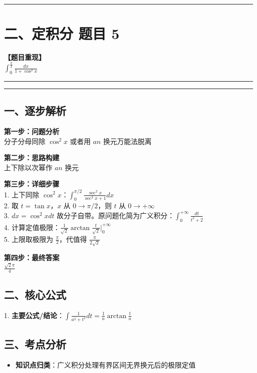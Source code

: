 ﻿\documentclass[12pt, a4paper]{ctexart}
\newcommand{\TopSeparator}{
    \par\noindent\rule{\textwidth}{1.5pt}\vspace{0.5em}
}
\newcommand{\AnalysisSeparator}{
    \par\noindent\rule{\textwidth}{0.5pt}\vspace{0.2em}\hrule\vspace{0.5em}
}
\newenvironment{RedAnalysis}{
    \par
    \color{red} 
}{
    \par
    \color{black} 
}
\begin{document}
\vspace{2em}

\TopSeparator
\section*{二、定积分 题目 5}

\textbf{【题目重现】} \\
$\int_{0}^{\frac{\pi}{2}} \frac{dx}{1+\cos^2 x}$

\AnalysisSeparator

\begin{RedAnalysis}

	\subsection*{一、逐步解析}

	\textbf{第一步：问题分析} \\
	分子分母同除 $\cos^2 x$ 或者用 $	an$ 换元万能法脱离

	\textbf{第二步：思路构建} \\
	上下除以次幂作 $	an$ 换元

	\textbf{第三步：详细步骤} \\
	1. 上下同除 $\cos^2 x$：$\int_0^{\pi/2} \frac{\sec^2 x}{\sec^2 x + 1} dx$ \\ 
	2. 取 $t = \tan x$，$x$ 从 $0 \to \pi/2$，则 $t$ 从 $0 \to +\infty$ \\ 
	3. $dx = \cos^2 x dt$ 故分子自带。原问题化简为广义积分：$\int_0^{+\infty} \frac{dt}{t^2+2}$ \\ 
	4. 计算定值极限：$\frac{1}{\sqrt{2}} \arctan \frac{t}{\sqrt{2}} \Big|_0^{+\infty}$ \\ 
	5. 上限取极限为 $\frac{\pi}{2}$，代值得 $\frac{\pi}{2\sqrt{2}}$

	\textbf{第四步：最终答案} \\
	$\frac{\sqrt{2}\pi}{4}$

	\subsection*{二、核心公式}
	1. \textbf{主要公式/结论}：$\int \frac{1}{a^2+t^2} dt = \frac{1}{a}\arctan\frac{t}{a}$

	\subsection*{三、考点分析}
	\begin{itemize}
		\item \textbf{知识点归类}：广义积分处理有界区间无界换元后的极限定值
	\end{itemize}

\end{RedAnalysis}
\end{document}
